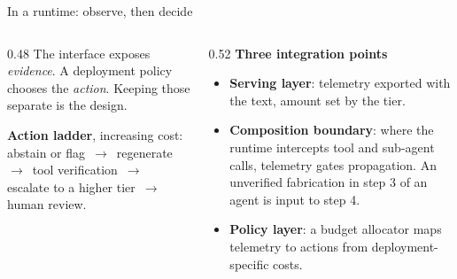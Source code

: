 \documentclass[aspectratio=169,10pt]{beamer}
\begin{document}
\begin{frame}{In a runtime: observe, then decide}
  \begin{columns}[T]
    \begin{column}{0.48\textwidth}
      The interface exposes \emph{evidence}. A deployment policy chooses the
      \emph{action}. Keeping those separate is the design.

      \vspace{0.4em}
      \textbf{Action ladder}, increasing cost:
      abstain or flag \,$\to$\, regenerate \,$\to$\, tool verification \,$\to$\,
      escalate to a higher tier \,$\to$\, human review.
    \end{column}
    \begin{column}{0.52\textwidth}
      \textbf{Three integration points}
      \begin{itemize}
        \item \textbf{Serving layer}: telemetry exported with the text, amount set
          by the tier.
        \item \textbf{Composition boundary}: where the runtime intercepts tool and
          sub-agent calls, telemetry gates propagation. An unverified fabrication in
          step 3 of an agent is input to step 4.
        \item \textbf{Policy layer}: a budget allocator maps telemetry to actions
          from deployment-specific costs.
      \end{itemize}
    \end{column}
  \end{columns}
\end{frame}
\end{document}
